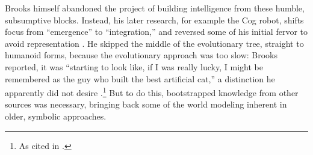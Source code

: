 Brooks himself abandoned the project of building intelligence from
these humble, subsumptive blocks. Instead, his later research, for example
the Cog robot, shifts focus from ``emergence'' to ``integration,'' and
reversed some of his initial fervor to avoid representation \cite[p.
  258]{ekbia}. He skipped the middle of the evolutionary tree, straight
to humanoid forms, because the evolutionary approach was too slow: 
Brooks reported, it was ``starting to look like, if I was really
lucky, I might be remembered as the guy who built the best artificial
cat,'' a distinction he apparently did not desire \cite[p.
  65]{brooksflesh}.\footnote{As cited in \cite[p. 258]{ekbia}.}
But to do this, bootstrapped knowledge from other sources was
necessary, bringing back some of the world modeling inherent in older,
symbolic approaches. 

